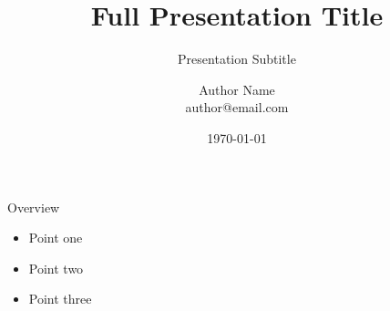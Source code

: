 \documentclass{beamer}
\title[Short Title]{Full Presentation Title}
\subtitle{Presentation Subtitle}
\author[Author Short]{Author Name \\ \small author@email.com}
\institute[Inst Short]{Institute Name \\ Department Name \\ University/Organization}
\date{\today}
\begin{document}
\begin{frame}[plain]
  \titlepage
\end{frame}

\begin{frame}{Overview}
  \begin{itemize}
    \item Point one
    \item Point two
    \item Point three
  \end{itemize}
\end{frame}
\end{document}
